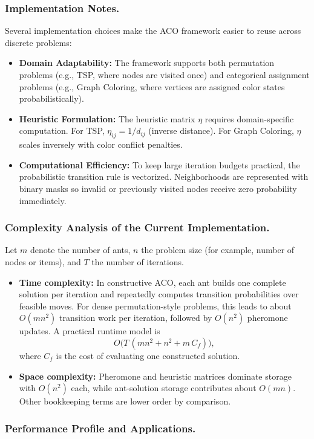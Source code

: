 \subsubsection{Implementation Notes.}
Several implementation choices make the ACO framework easier to reuse across discrete problems:
\begin{itemize}
  \item \textbf{Domain Adaptability:} The framework supports both permutation problems (e.g., TSP, where nodes are visited once) and categorical assignment problems (e.g., Graph Coloring, where vertices are assigned color states probabilistically).
    \item \textbf{Heuristic Formulation:} The heuristic matrix $\eta$ requires domain-specific computation. For TSP, $\eta_{ij} = 1 / d_{ij}$ (inverse distance). For Graph Coloring, $\eta$ scales inversely with color conflict penalties.
  \item \textbf{Computational Efficiency:} To keep large iteration budgets practical, the probabilistic transition rule is vectorized. Neighborhoods are represented with binary masks so invalid or previously visited nodes receive zero probability immediately.
\end{itemize}

\subsubsection{Complexity Analysis of the Current Implementation.}
Let $m$ denote the number of ants, $n$ the problem size (for example, number of nodes or items), and $T$ the number of iterations.
\begin{itemize}
  \item \textbf{Time complexity:} In constructive ACO, each ant builds one complete solution per iteration and repeatedly computes transition probabilities over feasible moves. For dense permutation-style problems, this leads to about $O(mn^2)$ transition work per iteration, followed by $O(n^2)$ pheromone updates. A practical runtime model is
  $$
  O\big(T\,(mn^2 + n^2 + m\,C_f)\big),
  $$
  where $C_f$ is the cost of evaluating one constructed solution.
  \item \textbf{Space complexity:} Pheromone and heuristic matrices dominate storage with $O(n^2)$ each, while ant-solution storage contributes about $O(mn)$. Other bookkeeping terms are lower order by comparison.
\end{itemize}

\subsubsection{Performance Profile and Applications.}


